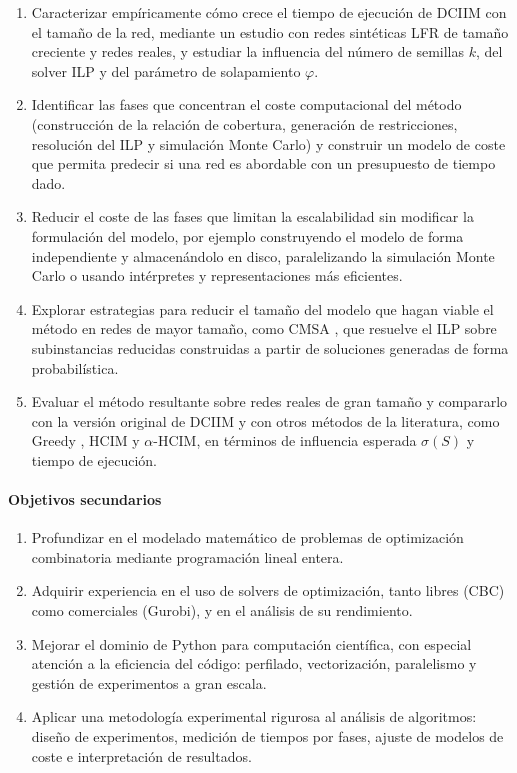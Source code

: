 \documentclass[12pt,twoside,titlepage]{report}
\begin{document}
\begin{enumerate}
    \item Caracterizar empíricamente cómo crece el tiempo de ejecución de DCIIM con el tamaño de la red, mediante un estudio con redes sintéticas LFR de tamaño creciente y redes reales, y estudiar la influencia del número de semillas $k$, del solver ILP y del parámetro de solapamiento $\varphi$.
    \item Identificar las fases que concentran el coste computacional del método (construcción de la relación de cobertura, generación de restricciones, resolución del ILP y simulación Monte Carlo) y construir un modelo de coste que permita predecir si una red es abordable con un presupuesto de tiempo dado.
    \item Reducir el coste de las fases que limitan la escalabilidad sin modificar la formulación del modelo, por ejemplo construyendo el modelo de forma independiente y almacenándolo en disco, paralelizando la simulación Monte Carlo o usando intérpretes y representaciones más eficientes.
    \item Explorar estrategias para reducir el tamaño del modelo que hagan viable el método en redes de mayor tamaño, como CMSA \cite{blum2024cmsa}, que resuelve el ILP sobre subinstancias reducidas construidas a partir de soluciones generadas de forma probabilística.
    \item Evaluar el método resultante sobre redes reales de gran tamaño y compararlo con la versión original de DCIIM y con otros métodos de la literatura, como Greedy \cite{kempe2003maximizing}, HCIM y $\alpha$-HCIM, en términos de influencia esperada $\sigma(S)$ y tiempo de ejecución.
\end{enumerate}

\paragraph{Objetivos secundarios}

\begin{enumerate}[resume]
    \item Profundizar en el modelado matemático de problemas de optimización combinatoria mediante programación lineal entera.
    \item Adquirir experiencia en el uso de solvers de optimización, tanto libres (CBC) como comerciales (Gurobi), y en el análisis de su rendimiento.
    \item Mejorar el dominio de Python para computación científica, con especial atención a la eficiencia del código: perfilado, vectorización, paralelismo y gestión de experimentos a gran escala.
    \item Aplicar una metodología experimental rigurosa al análisis de algoritmos: diseño de experimentos, medición de tiempos por fases, ajuste de modelos de coste e interpretación de resultados.
\end{enumerate}
\end{document}
